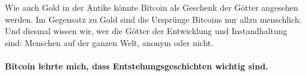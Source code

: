 Wie auch Gold in der Antike könnte Bitcoin als Geschenk der Götter angesehen
werden. Im Gegensatz zu Gold sind die Ursprünge Bitcoins nur allzu menschlich.
Und diesmal wissen wir, wer die Götter der Entwicklung und Instandhaltung sind:
Menschen auf der ganzen Welt, anonym oder nicht.

\paragraph{Bitcoin lehrte mich, dass Entstehungsgeschichten wichtig sind.}

%
%
%
%
